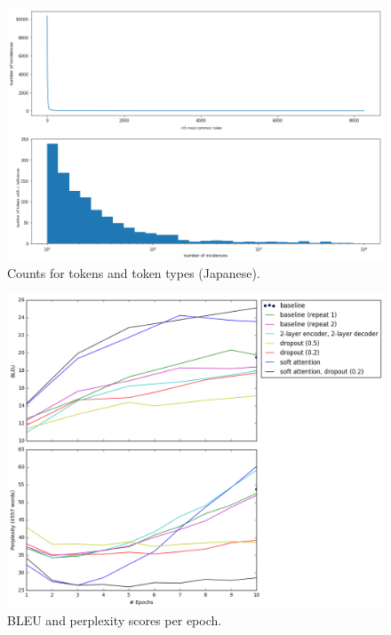 \documentclass[answers]{exam}
\begin{document}
\begin{CJK}{UTF8}{min}
\begin{figure}
  \centering
  \includegraphics[width=\linewidth]{fig-toks-fr}
  \caption{Counts for tokens and token types (Japanese).}
  \label{fig:toks-fr}
\end{figure}

\begin{figure}
  \centering
  \includegraphics[width=\linewidth]{fig-bleu-pplx}
  \caption{BLEU and perplexity scores per epoch.}
  \label{fig:bleu-pplx}
\end{figure}


\end{CJK}
\end{document}
